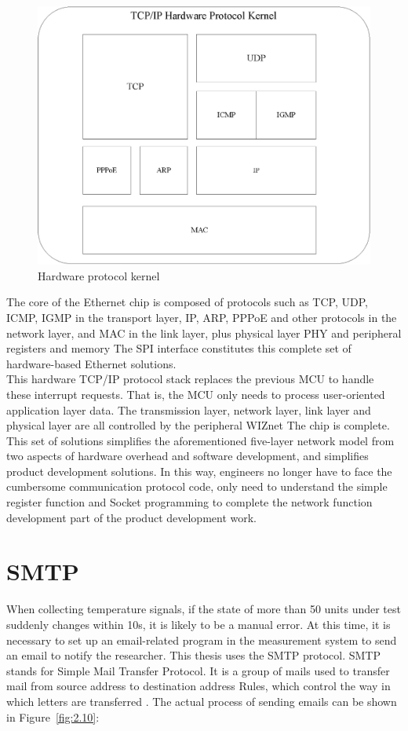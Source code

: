\begin{figure}[!ht]
	\centering
	\includegraphics[scale=0.85]{grafiken/2.9.eps}
	\caption{Hardware protocol kernel} 
	\label{fig:2.9}
\end{figure}
\FloatBarrier
The core of the Ethernet chip is composed of protocols such as TCP, UDP, ICMP, IGMP in the transport layer, IP, ARP, PPPoE and other protocols in the network layer, and MAC in the link layer, plus physical layer PHY and peripheral registers and memory The SPI interface constitutes this complete set of hardware-based Ethernet solutions.
\\
This hardware TCP/IP protocol stack replaces the previous MCU to handle these interrupt requests. That is, the MCU only needs to process user-oriented application layer data. The transmission layer, network layer, link layer and physical layer are all controlled by the peripheral WIZnet The chip is complete. This set of solutions simplifies the aforementioned five-layer network model from two aspects of hardware overhead and software development, and simplifies product development solutions. In this way, engineers no longer have to face the cumbersome communication protocol code, only need to understand the simple register function and Socket programming to complete the network function development part of the product development work.

\section{SMTP}
\label{sec:SMTP}
When collecting temperature signals, if the state of more than 50 units under test suddenly changes within 10s, it is likely to be a manual error. At this time, it is necessary to set up an email-related program in the measurement system to send an email to notify the researcher. This thesis uses the SMTP protocol.
SMTP stands for Simple Mail Transfer Protocol. It is a group of mails used to transfer mail from source address to destination address
Rules, which control the way in which letters are transferred \cite{xiao_shan2001principle}. The actual process of sending emails can be shown in Figure~\ref{fig:2.10}:
 
